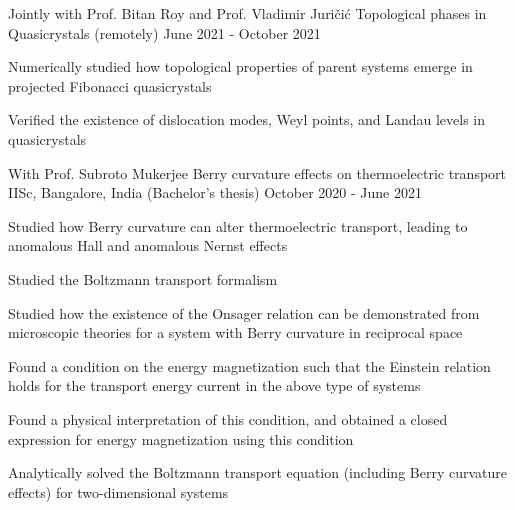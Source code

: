 

\begin{cventries}

\cventry
{Jointly with Prof. Bitan Roy and Prof. Vladimir Juri\v{c}i\'c} %
{Topological phases in Quasicrystals} %
{(remotely)} %
{June 2021 - October 2021} %
{
	\begin{cvitems} %
		\item {Numerically studied how topological properties of parent systems emerge in projected Fibonacci quasicrystals}
		\item {Verified the existence of dislocation modes, Weyl points, and Landau levels in quasicrystals}
	\end{cvitems}
}

\cventry
{With Prof. Subroto Mukerjee} %
{Berry curvature effects on thermoelectric transport} %
{IISc, Bangalore, India \space \space\space\space\space\space\space\space\space\space\space(Bachelor's thesis)} %
{October 2020 - June 2021} %
{
	\begin{cvitems} %
		\item {Studied how Berry curvature can alter thermoelectric transport, leading to anomalous Hall and anomalous Nernst effects}
		\item {Studied the Boltzmann transport formalism}
		\item {Studied how the existence of the Onsager relation can be demonstrated from microscopic theories for a system with Berry curvature in reciprocal space}
		\item {Found a condition on the energy magnetization such that the Einstein relation holds for the transport energy current in the above type of systems}
		\item {Found a physical interpretation of this condition, and obtained a closed expression for energy magnetization using this condition}
		\item {Analytically solved the Boltzmann transport equation (including Berry curvature effects) for two-dimensional systems}
	\end{cvitems}
}
	

\end{cventries}
